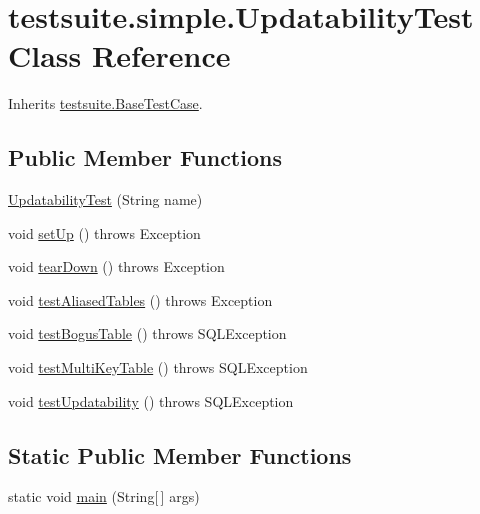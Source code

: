 \hypertarget{classtestsuite_1_1simple_1_1_updatability_test}{}\section{testsuite.\+simple.\+Updatability\+Test Class Reference}
\label{classtestsuite_1_1simple_1_1_updatability_test}


Inherits \mbox{\hyperlink{classtestsuite_1_1_base_test_case}{testsuite.\+Base\+Test\+Case}}.

\subsection*{Public Member Functions}
\begin{DoxyCompactItemize}
\item 
\mbox{\hyperlink{classtestsuite_1_1simple_1_1_updatability_test_a1ab7fd0482bf8c6fb2eec2e0bbc2be23}{Updatability\+Test}} (String name)
\item 
void \mbox{\hyperlink{classtestsuite_1_1simple_1_1_updatability_test_ad7b2d9338b6097dd1b03e99015426f7d}{set\+Up}} ()  throws Exception 
\item 
void \mbox{\hyperlink{classtestsuite_1_1simple_1_1_updatability_test_add9fa62db68ba414b064d6f89a0cfa6d}{tear\+Down}} ()  throws Exception 
\item 
void \mbox{\hyperlink{classtestsuite_1_1simple_1_1_updatability_test_a711d84fccc5379fc8389127a54893e15}{test\+Aliased\+Tables}} ()  throws Exception 
\item 
void \mbox{\hyperlink{classtestsuite_1_1simple_1_1_updatability_test_ac636788ee577887fe30ac0119eaba824}{test\+Bogus\+Table}} ()  throws S\+Q\+L\+Exception 
\item 
void \mbox{\hyperlink{classtestsuite_1_1simple_1_1_updatability_test_a689afecd2b1890b04a4c7b3a34fba460}{test\+Multi\+Key\+Table}} ()  throws S\+Q\+L\+Exception 
\item 
void \mbox{\hyperlink{classtestsuite_1_1simple_1_1_updatability_test_ab12c72b9cf7dfb5229204bd6bb482c4c}{test\+Updatability}} ()  throws S\+Q\+L\+Exception 
\end{DoxyCompactItemize}
\subsection*{Static Public Member Functions}
\begin{DoxyCompactItemize}
\item 
static void \mbox{\hyperlink{classtestsuite_1_1simple_1_1_updatability_test_aad2ca9a47cb41ccfdc8cf82a2335e1d0}{main}} (String\mbox{[}$\,$\mbox{]} args)
\end{DoxyCompactItemize}
